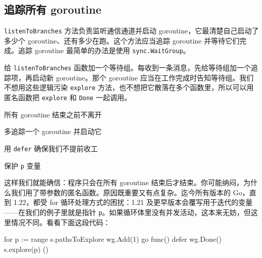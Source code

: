 \subsection{追踪所有 goroutine}

\texttt{listenToBranches} 方法负责监听通信通道并启动 goroutine，它最清楚自己启动了多少个 goroutine、还有多少在跑。这个方法应当追踪 goroutine 并等待它们完成。追踪 goroutine 最简单的办法是使用 \texttt{sync.WaitGroup}。

给 \texttt{listenToBranches} 函数加一个等待组。每收到一条消息，先给等待组加一个追踪项，再启动新 goroutine。那个 goroutine 应当在工作完成时告知等待组。我们不想用这些逻辑污染 \texttt{explore} 方法，也不想把它散落在多个函数里，所以可以用匿名函数把 \texttt{explore} 和 \texttt{Done} 一起调用。


\begin{codeannotations}
\item 所有 goroutine 结束之前不离开
\item 多追踪一个 goroutine 并启动它
\item 用 \texttt{defer} 确保我们不提前收工
\item 保护 \texttt{p} 变量
\end{codeannotations}

这样我们就能确信：程序只会在所有 goroutine 结束后才结束。你可能纳闷，为什么我们用了带参数的匿名函数。原因既重要又有点复杂。迄今所有版本的 Go，直到 1.22，都受 for 循环处理方式的困扰：1.21 及更早版本会覆写用于迭代的变量——在我们的例子里就是指针 \texttt{p}。如果循环体里没有并发活动，这本来无妨，但这里情况不同。看看下面这段代码：

\begin{gocode}[]
for p := range s.pathsToExplore {
    wg.Add(1)
    go func() {
        defer wg.Done()
        s.explore(p)
    }()
}
\end{gocode}

